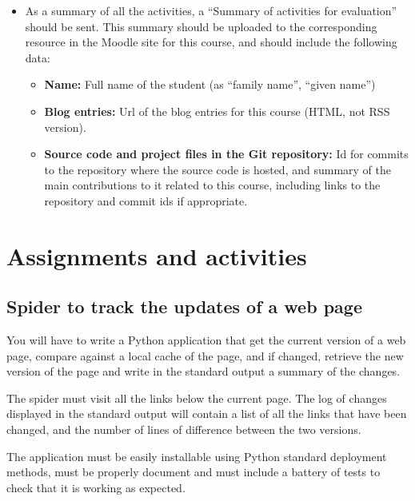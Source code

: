 \documentclass[a4paper]{article}
\begin{document}
\begin{itemize}
\item As a summary of all the activities, a ``Summary of activities
  for evaluation'' should be sent. This summary should be uploaded to
  the corresponding resource in the Moodle site for this course, and
  should include the following data: 
  \begin{itemize}
  \item \textbf{Name:} Full name of the student (as ``family name'', ``given name'')
  \item \textbf{Blog entries:} Url of the blog entries for this course (HTML, not RSS version).
  \item \textbf{Source code and project files in the Git repository:} Id for commits
    to the repository where the source code is hosted, and summary of
    the main contributions to it related to this course, including
    links to the repository and commit ids if appropriate. 
  \end{itemize}
\end{itemize}

\section{Assignments and activities}

\subsection{Spider to track the updates of a web page}
\label{sub:python}

You will have to write a Python application that get the current
version of a web page, compare against a local cache of the page, and
if changed, retrieve the new version of the page and write in the
standard output a summary of the changes.

The spider must visit all the links below the current page. The log of
changes displayed in the standard output will contain a list of all
the links that have been changed, and the number of lines of
difference between the two versions.

The application must be easily installable using Python standard
deployment methods, must be properly document and must include a
battery of tests to check that it is working as expected.
\end{document}
